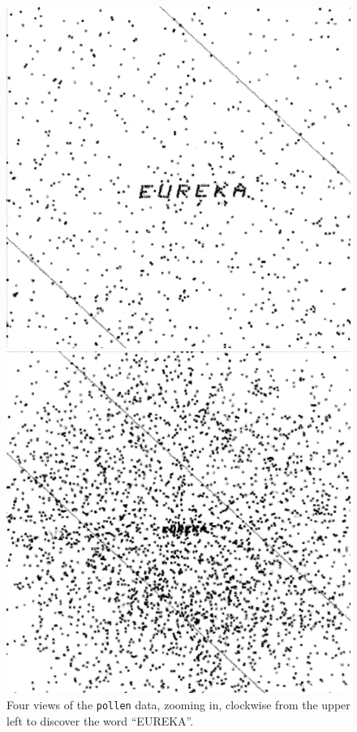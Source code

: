 \documentclass[
  letterpaper,
  10pt,
  krantz2]{krantz}
\begin{document}
\begin{figure}
\newline
\begin{minipage}{0.50\linewidth}
\includegraphics{images/pollen-eureka4.png}\end{minipage}%
%
\begin{minipage}{0.50\linewidth}
\includegraphics{images/pollen-eureka3.png}\end{minipage}%

\caption{\label{fig-pollen-eureka}Four views of the \texttt{pollen}
data, zooming in, clockwise from the upper left to discover the word
``EUREKA''.}

\end{figure}%
\end{document}
